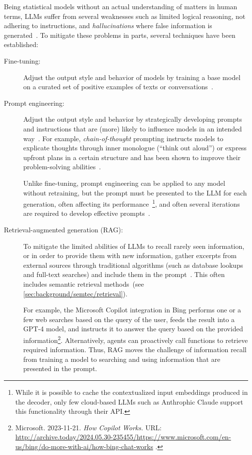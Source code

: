 Being statistical models without an actual understanding of matters in human terms, LLMs suffer from several weaknesses such as limited logical reasoning, not adhering to instructions, and \emph{hallucinations} where false information is generated~\cite{openai2024gpt4}.
To mitigate these problems in parts, several techniques have been established:
%
\begin{description}
	\item[Fine-tuning:] Adjust the output style and behavior of models by training a base model on a curated set of positive examples of texts or conversations~\cite{kojima2022large,wei2022finetuned}.

	\item[Prompt engineering:] Adjust the output style and behavior by strategically developing prompts and instructions that are (more) likely to influence models in an intended way~\cite{white2023prompt}.
	For example, \emph{chain-of-thought} prompting instructs models to explicate thoughts through inner monologue (``think out aloud'') or express upfront plans in a certain structure and has been shown to improve their problem-solving abilities~\cite{wei2023chainofthought}.

	Unlike fine-tuning, prompt engineering can be applied to any model without retraining, but the prompt must be presented to the LLM for each generation, often affecting its performance~\cite{zhao2023survey}\footnote{While it is possible to cache the contextualized input embeddings produced in the decoder, only few cloud-based LLMs such as Anthrophic Claude support this functionality through their API.}, and often several iterations are required to develop effective prompts~\cite{white2023prompt}.

	\item[Retrieval-augmented generation (RAG):] To mitigate the limited abilities of LLMs to recall rarely seen information, or in order to provide them with new information, gather excerpts from external sources through traditional algorithms (such as database lookups and full-text searches) and include them in the prompt~\cite{lewis2020retrieval}.
	This often includes semantic retrieval methods~(see \cref{sec:background/semtec/retrieval}).

	For example, the Microsoft Copilot integration in Bing performs one or a few web searches based on the query of the user, feeds the result into a GPT-4 model, and instructs it to answer the query based on the provided information\footnote{
		Microsoft. 2023-11-21. \emph{How Copilot Works.}
		URL:
		\url{http://archive.today/2024.05.30-235455/https://www.microsoft.com/en-us/bing/do-more-with-ai/how-bing-chat-works}%
		.
	}.
	Alternatively, agents can proactively call functions to retrieve required information.
	Thus, RAG moves the challenge of information recall from training a model to searching and using information that are presented in the prompt.
\end{description}

